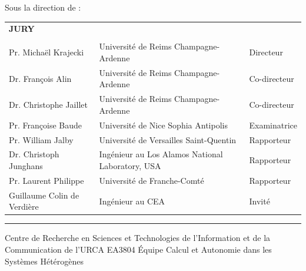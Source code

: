 \documentclass[11pt,a4paper]{book}
\begin{document}
{%
{
	Sous la direction de :\\ 
	\textbf{\phdDirector}
	\vspace{0.5cm}
	\vspace{\fill}
}

{
\normalsize
\begin{tabular}{l l l}
		\textbf{JURY} &  & \\
		&&\\
		Pr. Michaël Krajecki & Université de Reims Champagne-Ardenne & Directeur \\
		Dr. François Alin & Université de Reims Champagne-Ardenne & Co-directeur  \\
		Dr. Christophe Jaillet & Université de Reims Champagne-Ardenne & Co-directeur \\
		Pr. Françoise Baude & Université de Nice Sophia Antipolis& Examinatrice\\
		Pr. William Jalby & Université de Versailles Saint-Quentin & Rapporteur\\
		Dr. Christoph Junghans & Ingénieur au Los Alamos National Laboratory, USA & Rapporteur \\
		Pr. Laurent Philippe & Université de Franche-Comté & Rapporteur \\ 		
		Guillaume Colin de Verdi\`ere & Ingénieur au CEA & Invit\'e
\end{tabular}
\vspace{0.5cm}
\hrule
\vspace{0.3cm}
}

{
	Centre de Recherche en Sciences et Technologies de l'Information et de la Communication de l'URCA EA3804
}
{
	\'Equipe Calcul et Autonomie dans les Systèmes Hétérogènes
}

}

\clearpage 
{}
\thispagestyle{empty}

\frontmatter




%


\tableofcontents
\end{document}

